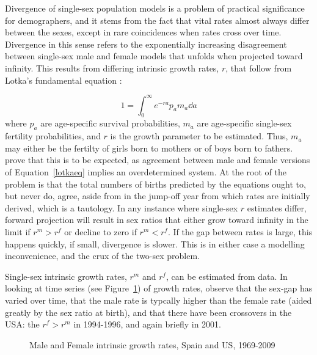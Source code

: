 
Divergence of single-sex population models is a problem of practical
significance for demographers, and it stems from the fact that vital rates almost always
differ between the sexes, except in rare coincidences when rates cross over
time. Divergence in this sense refers to the exponentially increasing
disagreement between single-sex male and female models that unfolds when
projected toward infinity. This results from differing intrinsic growth rates,
$r$, that follow from Lotka's fundamental equation \citep{sharpe1911problem}:

\begin{equation}
\label{eq:lotkaeq}
1 = \int _0 ^\infty e^{-ra}p_a m_a \dd a 
\end{equation}
where $p_a$ are age-specific survival probabilities, $m_a$ are age-specific
single-sex fertility probabilities, and $r$ is the growth parameter to be
estimated. Thus, $m_a$ may either be the fertilty of girls born to mothers or of
boys born to fathers. \citet{yellin1977comparison} prove that this is to be
expected, as agreement between male and female versions of
 Equation~\eqref{lotkaeq} implies an overdetermined
system. At the root of the problem is that the total numbers of births predicted
by the equations ought to, but never do, agree, aside from in the jump-off year
from which rates are initially derived, which is a tautology. In any instance
where single-sex $r$ estimates differ, forward projection will result in sex ratios 
that either grow toward infinity in the limit if $r^m
> r^f$ or decline to zero if $r^m < r^f$. If the gap between rates is large, this happens
quickly, if small, divergence is slower. This is in either case a modelling
inconvenience, and the crux of the two-sex problem. 

Single-sex intrinsic growth rates, $r^m$ and $r^f$, can be 
estimated from data. In looking at time series (see Figure~\ref{fig:rmf}) of 
 growth rates, observe that the sex-gap has varied over 
time, that the male rate is typcally higher than the female rate (aided greatly 
by the sex ratio at birth), and that there have been crossovers in the USA: 
the $r^f > r^m$ in 1994-1996, and again briefly in 2001. 

\begin{figure}[ht!]
        \centering  
          \caption{Male and Female intrinsic growth rates, Spain and US,
          1969-2009}
          \label{fig:rmf}
\end{figure}

